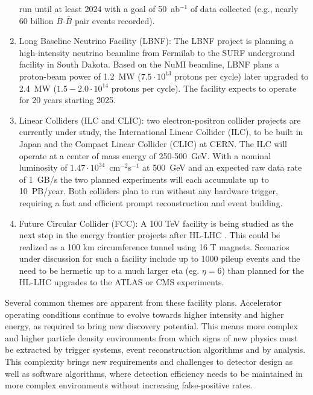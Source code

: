 \begin{enumerate}
run until at least 2024 with a goal of 50~ab$^{-1}$ of data collected (e.g., nearly 60 billion $B$-$\bar B$ pair events recorded). 
\item
Long Baseline Neutrino Facility (LBNF): The LBNF project \cite{DUNE2016} is planning a high-intensity neutrino beamline from Fermilab to the SURF underground facility in South Dakota. 
Based on the NuMI beamline, LBNF plans a proton-beam power of 1.2~MW ($7.5\cdot 10^{13}$ protons per cycle) later upgraded to 2.4~MW ($1.5-2.0 \cdot 10^{14}$ protons per cycle). The facility expects 
to operate for 20 years starting 2025.
\item 
Linear Colliders (ILC and CLIC): two electron-positron collider projects are currently under study, the International Linear Collider (ILC), to be built in Japan and the Compact 
Linear Collider (CLIC) at CERN. The ILC will operate at a center of mass energy of 250-500~GeV. With a nominal luminosity of $1.47\cdot 10^{34}$~cm$^{-2}$s$^{-1}$ at 500~GeV and an expected raw data 
rate of 1~GB/s the two planned experiments will each accumulate up to 10~PB/year. Both colliders plan to run without any hardware trigger, requiring a fast and efficient prompt 
reconstruction and event building.
\item
Future Circular Collider (FCC): A 100 TeV facility is being studied as the next step in the energy frontier projects after HL-LHC \cite{Ball2014}. This could be realized as a 100 km 
circumference tunnel using 16 T magnets. Scenarios under discussion for such a facility include up to 1000 pileup events and the need to be hermetic up to a much larger eta 
(eg. $\eta=6$) than planned for the HL-LHC upgrades to the ATLAS or CMS experiments. 
\end{enumerate}
Several common themes are apparent from these facility plans. Accelerator operating conditions continue to evolve towards higher intensity and higher energy, as required to bring
new discovery potential. This means more complex and higher particle density environments from which signs of new physics must be extracted by trigger systems, event reconstruction 
algorithms and by analysis. This complexity brings new requirements and challenges to detector design as well as software algorithms, where detection efficiency needs to be maintained 
in more complex environments without increasing false-positive rates. 

